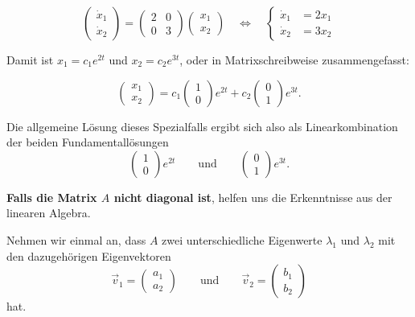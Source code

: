 \[
    \begin{pmatrix}
        \dot{x}_1 \\
        \dot{x}_2
    \end{pmatrix}
    =
    \begin{pmatrix}
        2 & 0 \\
        0 & 3
    \end{pmatrix}
    \begin{pmatrix}
        x_1 \\
        x_2
    \end{pmatrix}
    \quad\Longleftrightarrow\quad
    \left\{
    \begin{aligned}
        \dot{x}_1 & = 2x_1 \\
        \dot{x}_2 & = 3x_2
    \end{aligned}
    \right.
\]

Damit ist \(x_1=c_1e^{2t}\) und \(x_2=c_2e^{3t}\), oder in Matrixschreibweise zusammengefasst:

\[
    \begin{pmatrix}
        x_1 \\
        x_2
    \end{pmatrix}
    =
    c_1
    \begin{pmatrix}
        1 \\
        0
    \end{pmatrix}
    e^{2t}
    +
    c_2
    \begin{pmatrix}
        0 \\
        1
    \end{pmatrix}
    e^{3t}.
\]

Die allgemeine Lösung dieses Spezialfalls ergibt sich also als Linearkombination der beiden Fundamentallösungen
\[
    \begin{pmatrix}
        1 \\
        0
    \end{pmatrix}e^{2t}
    \qquad\text{und}\qquad
    \begin{pmatrix}
        0 \\
        1
    \end{pmatrix}e^{3t}.
\]

\medskip

\textbf{Falls die Matrix \(A\) nicht diagonal ist}, helfen uns die Erkenntnisse aus der linearen Algebra.

Nehmen wir einmal an, dass \(A\) zwei unterschiedliche Eigenwerte \(\lambda_1\) und \(\lambda_2\) mit den dazugehörigen Eigenvektoren
\[
    \vec{v}_1=
    \begin{pmatrix}
        a_1 \\
        a_2
    \end{pmatrix}
    \qquad\text{und}\qquad
    \vec{v}_2=
    \begin{pmatrix}
        b_1 \\
        b_2
    \end{pmatrix}
\]
hat.

